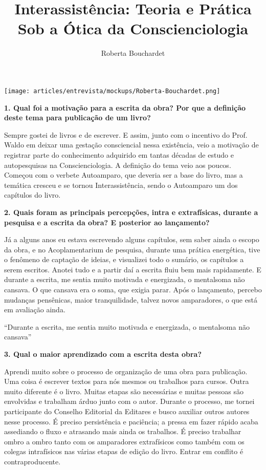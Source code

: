 \documentclass{gescons}
\author{Roberta Bouchardet}
\title{Interassistência: Teoria e Prática Sob a Ótica da Conscienciologia}
\begin{document}
    \makeentrevistatitle

    \begin{multicols}{2}

\begin{center}
    \texttt{[image: articles/entrevista/mockups/Roberta-Bouchardet.png]}
\end{center}


\textbf{1.       Qual foi a motivação para a escrita da obra? Por que a definição deste tema para publicação de um livro?}

Sempre gostei de livros e de escrever. E assim, junto com o incentivo do Prof. Waldo em deixar uma gestação consciencial nessa existência, veio a motivação de registrar parte do conhecimento adquirido em tantas décadas de estudo e autopesquisas na Conscienciologia. A definição do tema veio aos poucos. Começou com o verbete Autoamparo, que deveria ser a base do livro, mas a temática cresceu e se tornou Interassistência, sendo o Autoamparo um dos capítulos do livro.

\textbf{2.       Quais foram as principais percepções, intra e extrafísicas, durante a pesquisa e a escrita da obra? E posterior ao lançamento?}

Já a alguns anos eu estava escrevendo alguns capítulos, sem saber ainda o escopo da obra, e no Acoplamentarium de pesquisa, durante uma prática energética, tive o fenômeno de captação de ideias, e visualizei todo o sumário, os capítulos a serem escritos. Anotei tudo e a partir daí a escrita fluiu bem mais rapidamente. E durante a escrita, me sentia muito motivada e energizada, o mentalsoma não cansava. O que cansava era o soma, que exigia parar. Após o lançamento, percebo mudanças pensênicas, maior tranquilidade, talvez novos amparadores, o que está em avaliação ainda.

\begin{pullquote}
    ``Durante a escrita, me sentia muito motivada e energizada, o mentalsoma não cansava''
\end{pullquote}


\textbf{3.       Qual o maior aprendizado com a escrita desta obra?}

Aprendi muito sobre o processo de organização de uma obra para publicação. Uma coisa é escrever textos para nós mesmos ou trabalhos para cursos. Outra muito diferente é o livro. Muitas etapas são necessárias e muitas pessoas são envolvidas e trabalham árduo junto com o autor. Durante o processo, me tornei participante do Conselho Editorial da Editares e busco auxiliar outros autores nesse processo. É preciso persistência e paciência; a pressa em fazer rápido acaba assediando o fluxo e atrasando mais ainda os trabalhos. É preciso trabalhar ombro a ombro tanto com os amparadores extrafísicos como também com os colegas intrafísicos nas várias etapas de edição do livro. Entrar em conflito é contraproducente.


\end{multicols}
\end{document}
